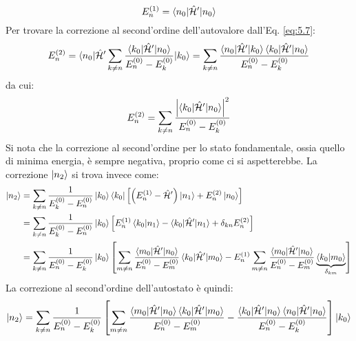 \begin{equation}
	E_n^{(1)} = \braket{n_0 | \hat{\mathcal{H}}' | n_0}
	\label{eq:5.11}
\end{equation}
Per trovare la correzione al second'ordine dell'autovalore dall'Eq. \ref{eq:5.7}:
\begin{equation*}
	E_n^{(2)} = \braket{n_0 | \hat{\mathcal{H}}' \sum_{k \neq n} \frac{\braket{k_0 | \hat{\mathcal{H}}' | n_0}}{E_n^{(0)} - E_k^{(0)}} | k_0} = \sum_{k \neq n} \frac{\braket{n_0 | \hat{\mathcal{H}}' | k_0} \braket{k_0 | \hat{\mathcal{H}}' | n_0}}{E_n^{(0)} - E_k^{(0)}}
\end{equation*}
da cui:
\begin{equation}
	E_n^{(2)} = \sum_{k \neq n} \frac{\left\lvert\braket{k_0 | \hat{\mathcal{H}}' | n_0}\right\rvert^2}{E_n^{(0)} - E_k^{(0)}}
	\label{eq:5.12}
\end{equation}
Si nota che la correzione al second'ordine per lo stato fondamentale, ossia quello di minima energia, è sempre negativa, proprio come ci si aspetterebbe.
La correzione $ \ket{n_2} $ si trova invece come:
\begin{equation*}
	\begin{split}
		\ket{n_2}
		&= \sum_{k \neq n} \frac{1}{E_k^{(0)} - E_n^{(0)}} \ket{k_0} \bra{k_0} \left[ \left( E_n^{(1)} - \hat{\mathcal{H}}' \right) \ket{n_1} + E_n^{(2)} \ket{n_0} \right] \\
		&= \sum_{k \neq n} \frac{1}{E_k^{(0)} - E_n^{(0)}} \ket{k_0} \left[ E_n^{(1)} \braket{k_0 | n_1} - \braket{k_0 | \hat{\mathcal{H}}' | n_1} + \delta_{kn} E_n^{(2)} \right] \\
		&= \sum_{k \neq n} \frac{1}{E_n^{(0)} - E_k^{(0)}} \ket{k_0} \left[ \sum_{m \neq n} \frac{\braket{m_0 | \hat{\mathcal{H}}' | n_0}}{E_n^{(0)} - E_m^{(0)}} \braket{k_0 | \hat{\mathcal{H}}' | m_0} - E_n^{(1)} \sum_{m \neq n} \frac{\braket{m_0 | \hat{\mathcal{H}}' | n_0}}{E_n^{(0)} - E_m^{(0)}} \underbrace{\braket{k_0 | m_0}}_{\delta_{km}} \right]
	\end{split}
\end{equation*}
La correzione al second'ordine dell'autostato è quindi:
\begin{equation}
	\ket{n_2} = \sum_{k \neq n} \frac{1}{E_n^{(0)} - E_k^{(0)}} \left[ \sum_{m \neq n} \frac{\braket{m_0 | \hat{\mathcal{H}}' | n_0} \braket{k_0 | \hat{\mathcal{H}}' | m_0}}{E_n^{(0)} - E_m^{(0)}} - \frac{\braket{k_0 | \hat{\mathcal{H}}' | n_0} \braket{n_0 | \hat{\mathcal{H}}' | n_0}}{E_n^{(0)} - E_k^{(0)}} \right] \ket{k_0}
	\label{eq:5.13}
\end{equation}

